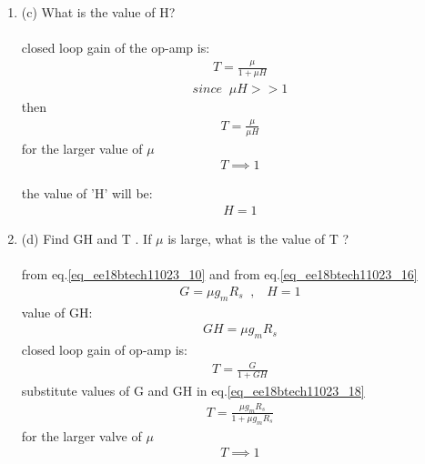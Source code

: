 \begin{enumerate}[label=\thesection.\arabic*.,ref=\thesection.\theenumi]
\item
\label{Question_1c_ee18btech11023}
(c) What is the value of H?
\\
\solution\\
closed loop gain of the op-amp is:
\begin{align}
    T = \frac{\mu}{1 + \mu H}
    \label{eq_ee18btech11023_14}
\end{align}
\begin{align*}
    since \;\; \mu H >> 1
\end{align*}
then 
\begin{align}
    T = \frac{\mu}{\mu H}
    \label{eq_ee18btech11023_15}
\end{align}
for the larger value of $\mu$
\begin{align*}
   T \implies 1 
\end{align*}

the value of 'H' will be:
\begin{align}
    H = 1
    \label{eq_ee18btech11023_16}
\end{align}
\item
\label{Question_1d_ee18btech11023}
(d) Find GH and T . If $\mu$ is large, what is the value of T ?\\
\solution\\
from eq.\ref{eq_ee18btech11023_10} and from eq.\ref{eq_ee18btech11023_16}
\begin{align*}
    G = \mu g_m R_s\;\; ,  \;\;\; H = 1
\end{align*}
value of GH:
\begin{align}
    GH = \mu g_m R_s
     \label{eq_ee18btech11023_17}
\end{align}
closed loop gain of op-amp is:
\begin{align}
    T = \frac{G}{1+GH}
     \label{eq_ee18btech11023_18}
\end{align}
substitute values of G and GH in eq.\ref{eq_ee18btech11023_18}
\begin{align}
    T = \frac{\mu g_m R_s}{1+\mu g_m R_s}
    \label{eq_ee18btech11023_19}
\end{align}
for the larger valve of $\mu$
\begin{align}
    T \implies 1
    \label{eq_ee18btech11023_20}
\end{align}


\end{enumerate}
